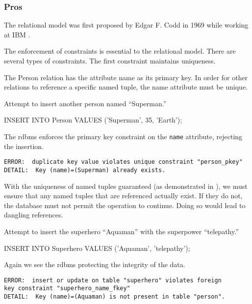 		\subsubsection{Pros}
			The relational model was first proposed by Edgar F. Codd in 1969 while working at IBM \cite{codd-69}.
			
			The enforcement of constraints is essential to the relational model.  There are several types of constraints.  The first constraint maintains uniqueness.
			
			The Person relation has the attribute name as its primary key.	In order for other relations to reference a specific named tuple, the name attribute must be unique.
			
			\begin{ex}
			\label{ex:unique-constraint}
				Attempt to insert another person named ``Superman.''
				
				\begin{singlespaced}
					\begin{sqlcode}
INSERT INTO Person
VALUES		('Superman',
			 35,
			 'Earth'); 
					\end{sqlcode}
				\end{singlespaced}
				
				The \gls{rdbms} enforces the primary key constraint on the \texttt{name} attribute, rejecting the insertion.
				
				\begin{verbatim}
ERROR:	duplicate key value violates unique constraint "person_pkey"
DETAIL:	 Key (name)=(Superman) already exists.
				\end{verbatim}
			\end{ex}
			
			With the uniqueness of named tuples guaranteed (as demonstrated in ), we must ensure that any named tuples that are referenced actually exist.  If they do not, the database must not permit the operation to continue.	Doing so would lead to dangling references.
			
			\begin{ex}
				Attempt to insert the superhero ``Aquaman'' with the superpower ``telepathy.''
				
				\begin{singlespaced}
					\begin{sqlcode}
INSERT INTO Superhero
VALUES		('Aquaman',
			 'telepathy'); 
					\end{sqlcode}
				\end{singlespaced}
				
				Again we see the \gls{rdbms} protecting the integrity of the data.
				
				\begin{verbatim}
ERROR:	insert or update on table "superhero" violates foreign
key constraint "superhero_name_fkey"
DETAIL:	 Key (name)=(Aquaman) is not present in table "person".
				\end{verbatim}
			\end{ex}
			
